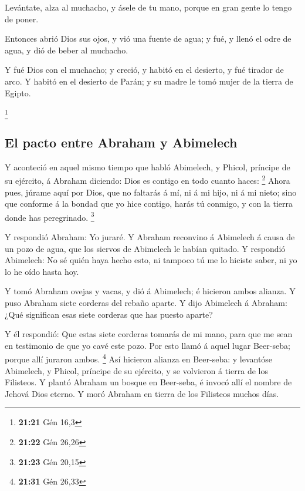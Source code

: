  Levántate, alza al muchacho, y ásele de tu mano, porque en
gran gente lo tengo de poner.

 Entonces abrió Dios sus ojos, y vió una fuente de agua; y
fué, y llenó el odre de agua, y dió de beber al muchacho.

 Y fué Dios con el muchacho; y creció, y habitó en el
desierto, y fué tirador de arco.  Y habitó en el desierto
de Parán; y su madre le tomó mujer de la tierra de Egipto.

\footnote{\textbf{21:21} Gén 16,3}

\hypertarget{el-pacto-entre-abraham-y-abimelech}{%
\subsection{El pacto entre Abraham y
Abimelech}\label{el-pacto-entre-abraham-y-abimelech}}

 Y aconteció en aquel mismo tiempo que habló Abimelech, y
Phicol, príncipe de su ejército, á Abraham diciendo: Dios es contigo en
todo cuanto haces: \footnote{\textbf{21:22} Gén 26,26} 
Ahora pues, júrame aquí por Dios, que no faltarás á mí, ni á mi hijo, ni
á mi nieto; sino que conforme á la bondad que yo hice contigo, harás tú
conmigo, y con la tierra donde has peregrinado. \footnote{\textbf{21:23}
  Gén 20,15}

 Y respondió Abraham: Yo juraré.  Y Abraham
reconvino á Abimelech á causa de un pozo de agua, que los siervos de
Abimelech le habían quitado.  Y respondió Abimelech: No sé
quién haya hecho esto, ni tampoco tú me lo hiciste saber, ni yo lo he
oído hasta hoy.

 Y tomó Abraham ovejas y vacas, y dió á Abimelech; é
hicieron ambos alianza.  Y puso Abraham siete corderas del
rebaño aparte.  Y dijo Abimelech á Abraham: ¿Qué significan
esas siete corderas que has puesto aparte?

 Y él respondió: Que estas siete corderas tomarás de mi
mano, para que me sean en testimonio de que yo cavé este pozo.
 Por esto llamó á aquel lugar Beer-seba; porque allí
juraron ambos. \footnote{\textbf{21:31} Gén 26,33}  Así
hicieron alianza en Beer-seba: y levantóse Abimelech, y Phicol, príncipe
de su ejército, y se volvieron á tierra de los Filisteos. 
Y plantó Abraham un bosque en Beer-seba, é invocó allí el nombre de
Jehová Dios eterno.  Y moró Abraham en tierra de los
Filisteos muchos días.

